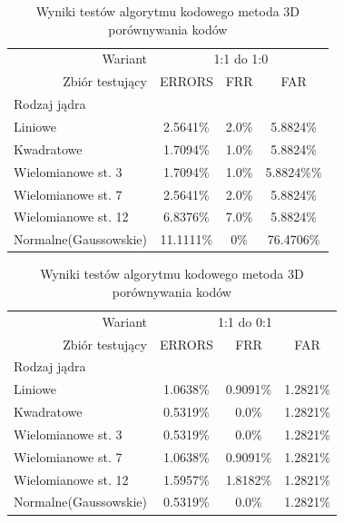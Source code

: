     \begin{table}[!htb]
    \begin{tabular}{p{3cm}|r||c|c|c|}
	\cline{2-5}
    & Wariant & \multicolumn{3}{|c|}{1:1 do 1:0} \\ \cline{2-5} 
    & Zbiór testujący & ERRORS  & FRR & FAR\\ \hline
	\multicolumn{2}{|l||}{Rodzaj jądra} &  \multicolumn{3}{|c|}{}\\
	\hline\hline
    \multicolumn{2}{|l||}{Liniowe} & 2.5641\% & 2.0\% & 5.8824\%\\ \hline
    \multicolumn{2}{|l||}{Kwadratowe} & 1.7094\% & 1.0\% & 5.8824\%\\ \hline
    \multicolumn{2}{|l||}{Wielomianowe st. 3} & 1.7094\% & 1.0\% & 5.8824\%\%\\ \hline
    \multicolumn{2}{|l||}{Wielomianowe st. 7} & 2.5641\% & 2.0\% & 5.8824\%\\ \hline
    \multicolumn{2}{|l||}{Wielomianowe st. 12} & 6.8376\% & 7.0\% & 5.8824\%\\ \hline
    \multicolumn{2}{|l||}{Normalne(Gaussowskie)} & 11.1111\% & 0\% & 76.4706\%\\ \hline
    \end{tabular}
	\caption{Wyniki testów algorytmu kodowego metoda 3D porównywania kodów}
	\label{tab:3D_pattern}
    \end{table}
    
    \begin{table}[!htb]
    \begin{tabular}{p{3cm}|r||c|c|c|}
	\cline{2-5}
    & Wariant & \multicolumn{3}{|c|}{1:1 do 0:1} \\ \cline{2-5} 
    & Zbiór testujący & ERRORS  & FRR & FAR\\ \hline
	\multicolumn{2}{|l||}{Rodzaj jądra} &  \multicolumn{3}{|c|}{}\\
	\hline\hline
    \multicolumn{2}{|l||}{Liniowe} & 1.0638\% & 0.9091\% & 1.2821\% \\ \hline
    \multicolumn{2}{|l||}{Kwadratowe} & 0.5319\% & 0.0\% & 1.2821\%\\ \hline
    \multicolumn{2}{|l||}{Wielomianowe st. 3} & 0.5319\% & 0.0\% & 1.2821\%\\ \hline
    \multicolumn{2}{|l||}{Wielomianowe st. 7} & 1.0638\% & 0.9091\% & 1.2821\%\\ \hline
    \multicolumn{2}{|l||}{Wielomianowe st. 12} & 1.5957\% & 1.8182\% & 1.2821\%\\ \hline
    \multicolumn{2}{|l||}{Normalne(Gaussowskie)} & 0.5319\% & 0.0\% & 1.2821\%\\ \hline
    \end{tabular}
	\caption{Wyniki testów algorytmu kodowego metoda 3D porównywania kodów}
	\label{tab:3D_sample}	
    \end{table}
    
